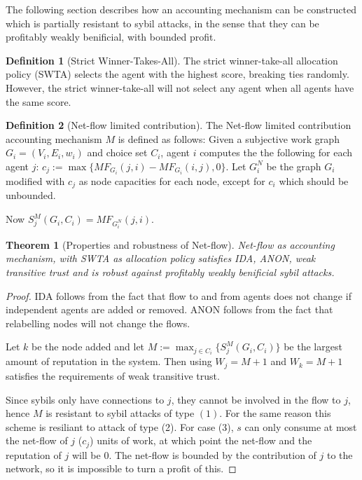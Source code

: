 \documentclass[a4paper,11pt]{book}
\newtheorem{theorem}{Theorem}
\theoremstyle{definition}
\newtheorem{definition}{Definition}
\begin{document}
The following section describes how an accounting mechanism can be constructed which is partially
resistant to sybil attacks, in the sense that they can be profitably weakly benificial, with bounded
profit.

\begin{definition}[Strict Winner-Takes-All]
   The strict winner-take-all allocation policy (SWTA) selects the agent with the highest score,
   breaking ties randomly. However, the strict winner-take-all will not select any agent
   when all agents have the same score.
    
\end{definition}

\begin{definition}[Net-flow limited contribution]
    The Net-flow limited contribution accounting mechanism $M$ is defined as follows:
    Given a subjective work graph $G_i = (V_i, E_i, w_i)$ and choice set $C_i$, agent
    $i$ computes the the following for each agent $j$: 
    $c_j := \max\{MF_{G_i}(j,i) - MF_{G_i}(i,j), 0\}$.
    Let $G_i^N$ be the graph $G_i$ modified with $c_j$ as node capacities for each node,
    except for $c_i$ which should be unbounded.

    Now $S^M_j(G_i, C_i) = MF_{G_i^N}(j, i)$.
\end{definition}

\begin{theorem}[Properties and robustness of Net-flow]
    Net-flow as accounting mechanism, with SWTA as allocation policy
    satisfies IDA, ANON, weak transitive trust and is robust against
    profitably weakly benificial sybil attacks.

    \label{thm:prop-rob-net-flow}
\end{theorem}

\begin{proof}
    IDA follows from the fact that flow to and from agents does not change if independent agents
    are added or removed. ANON follows from the fact that relabelling nodes will not change the flows.

    Let $k$ be the node added and let 
    $M := \max_{j \in C_i}\{S^M_j(G_i, C_i)\}$ be the largest amount of reputation in the system.
    Then using $W_j = M+1$ and $W_k = M+1$ satisfies the requirements of weak transitive trust.

    Since sybils only have connections to $j$, they cannot be involved in the flow to $j$, hence
    $M$ is resistant to sybil attacks of type $(1)$. For the same reason this scheme is resiliant
    to attack of type (2). For case (3), $s$ can only consume at most the net-flow of $j$ ($c_j$)
    units of work, at which point the net-flow and the reputation of $j$ will be $0$. The net-flow
    is bounded by the contribution of $j$ to the network, so it is impossible to turn a profit of this.
\end{proof}
\end{document}
